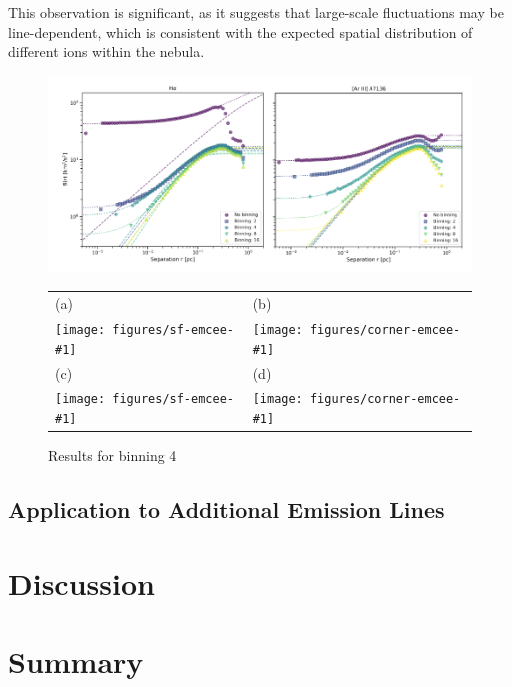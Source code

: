\documentclass[fleqn,usenatbib, useAMS, a4paper]{mnras}
\makeatletter
\newcommand\SFtwograph[2]{%
  \texttt{[image: figures/sf-emcee-\#1]}
  &  \texttt{[image: figures/corner-emcee-\#1]}
}
\newcommand\sffigggg[4]{%
  \begin{tabular}{@{}ll@{}}
    (a)& (b)\\
    \SFtwograph{#1}{#2}\\
    (c)& (d)\\
    \SFtwograph{#3}{#4}\\
  \end{tabular}%
}
\makeatother
\begin{document}
This observation is significant, as it suggests that large-scale fluctuations may be line-dependent, which is consistent with the expected spatial distribution of different ions within the nebula.









\begin{figure}
 \centering
 \includegraphics[width=6.5in]{figures/bin comparison.png}\par
 \caption{
 }
\label{fig:figures/bin comparison}
\end{figure}

\begin{figure}
  \centering
  \sffigggg{H_I-6563_mask_bin_4}{H_I-6563_mask_bin_4}{Ar_III-7136_mask_bin_4}{Ar_III-7136_mask_bin_4}
  \caption{ Results for binning 4
  }
  \label{fig:Orion_sf_1}
\end{figure}

\subsection{Application to Additional Emission Lines}












\section{Discussion}\label{sec:discussion}

\section{Summary}\label{sec:summary}
\end{document}
